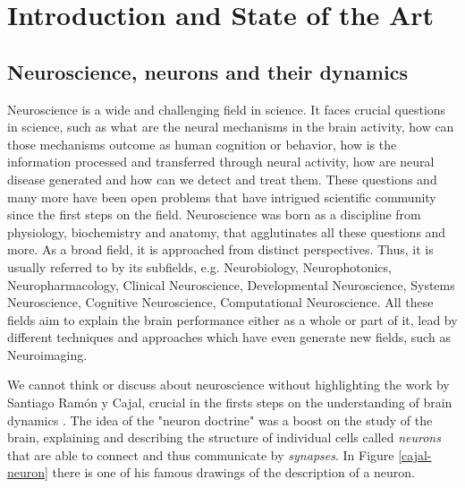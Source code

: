 \chapter{Introduction and State of the Art}
\label{c-intro}

\section{Neuroscience, neurons and their dynamics}
Neuroscience is a wide and challenging field in science. It faces crucial questions in science, such as what are the neural mechanisms in the brain activity, how can those mechanisms outcome as human cognition or behavior, how is the information processed and transferred through neural activity, how are neural disease generated and how can we detect and treat them. 
These questions and many more have been open problems that have intrigued scientific community since the first steps on the field. Neuroscience was born as a discipline from physiology, biochemistry and anatomy, that agglutinates all these questions and more. As a broad field, it is approached from distinct perspectives. Thus, it is usually referred to by its subfields, e.g. Neurobiology, Neurophotonics, Neuropharmacology, Clinical Neuroscience, Developmental Neuroscience, Systems Neuroscience, Cognitive Neuroscience, Computational Neuroscience. All these fields aim to explain the brain performance either as a whole or part of it, lead by different techniques and approaches which have even generate new fields, such as Neuroimaging.

We cannot think or discuss about neuroscience without highlighting the work by Santiago Ramón y Cajal, crucial in the firsts steps on the understanding of brain dynamics \cite{de_carlos_historical_2007,de_castro_editorial_2016,delgado-garcia_cajal_2015,de_castro_cajal_2019}. The idea of the "neuron doctrine" was a boost on the study of the brain, explaining and describing the structure of individual cells called \textit{neurons} that are able to connect and thus communicate by \textit{synapses}. In Figure \ref{cajal-neuron} there is one of his famous drawings of the description of a neuron.

